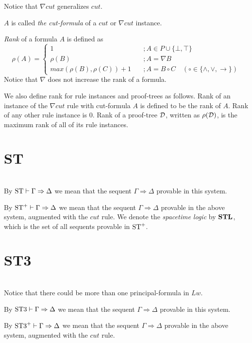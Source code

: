 \documentclass[a4paper, 12pt]{paper}
\begin{document}
Notice that $\nabla cut$ generalizes $cut$.

$A$ is called \emph{the cut-formula} of a $cut$ or $\nabla cut$ instance.

\emph{Rank} of a formula $A$ is defined as
\[ \rho(A) = \begin{cases}
1 & \quad ; A \in P \cup \{ \bot, \top \} \\
\rho(B) & \quad ; A = \nabla B \\
max(\rho(B), \rho(C)) + 1 & \quad ; A = B \circ C \quad (\circ \in \{ \land, \lor, \rightarrow \})
\end{cases} \]
Notice that $\nabla$ does not increase the rank of a formula.

We also define rank for rule instances and proof-trees as follows. Rank of an instance of the $\nabla cut$ rule with cut-formula $A$ is defined to be the rank of $A$. Rank of any other rule instance is $0$.
Rank of a proof-tree $\mathcal{D}$, written as $\rho(\mathcal{D})$, is the maximum rank of all of its rule instances.


\section{ST} \quad \\



By $\text{ST} \vdash \Gamma \Rightarrow \Delta$ we mean that the sequent $\Gamma \Rightarrow \Delta$ provable in this system.

By $\text{ST}^+ \vdash \Gamma \Rightarrow \Delta$ we mean that the sequent $\Gamma \Rightarrow \Delta$ provable in the above system, augmented with the $cut$ rule. 
We denote the \emph{spacetime logic} by $\mathbf{STL}$, which is the set of all sequents provable in $\text{ST}^+$.



\section{ST3} \quad \\




Notice that there could be more than one principal-formula in $Lw$.

By $\text{ST3} \vdash \Gamma \Rightarrow \Delta$ we mean that the sequent $\Gamma \Rightarrow \Delta$ provable in this system.

By $\text{ST3}^+ \vdash \Gamma \Rightarrow \Delta$ we mean that the sequent $\Gamma \Rightarrow \Delta$ provable in the above system, augmented with the $cut$ rule.
\end{document}

